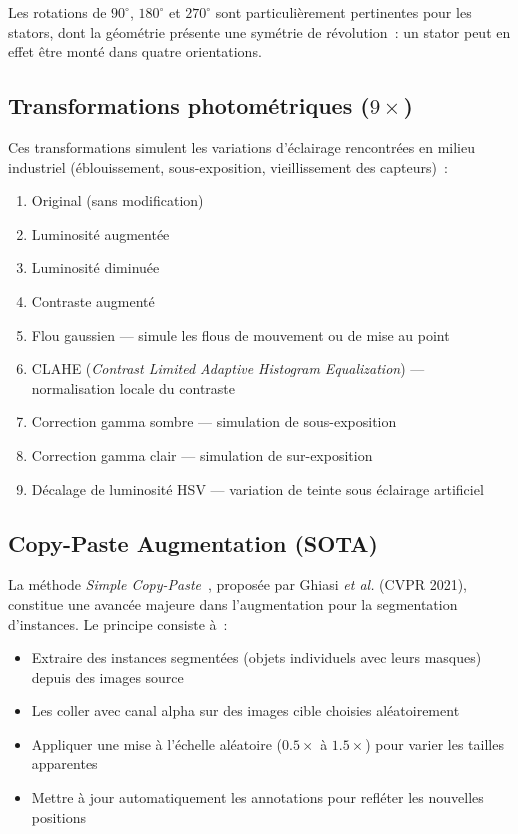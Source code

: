 \documentclass[12pt,a4paper]{report}
\begin{document}
Les rotations de $90^{\circ}$, $180^{\circ}$ et $270^{\circ}$ sont particuli\`erement pertinentes pour les stators, dont la g\'eom\'etrie pr\'esente une sym\'etrie de r\'evolution~: un stator peut en effet \^etre mont\'e dans quatre orientations.

\subsection{Transformations photom\'etriques ($9\times$)}

Ces transformations simulent les variations d'\'eclairage rencontr\'ees en milieu industriel (\'eblouissement, sous-exposition, vieillissement des capteurs)~:
\begin{enumerate}
    \item Original (sans modification)
    \item Luminosit\'e augment\'ee
    \item Luminosit\'e diminu\'ee
    \item Contraste augment\'e
    \item Flou gaussien --- simule les flous de mouvement ou de mise au point
    \item CLAHE (\textit{Contrast Limited Adaptive Histogram Equalization}) --- normalisation locale du contraste
    \item Correction gamma sombre --- simulation de sous-exposition
    \item Correction gamma clair --- simulation de sur-exposition
    \item D\'ecalage de luminosit\'e HSV --- variation de teinte sous \'eclairage artificiel
\end{enumerate}

\subsection{Copy-Paste Augmentation (SOTA)}

La m\'ethode \textit{Simple Copy-Paste}~\cite{ghiasi2021copypaste}, propos\'ee par Ghiasi \textit{et al.} (CVPR 2021), constitue une avanc\'ee majeure dans l'augmentation pour la segmentation d'instances. Le principe consiste \`a~:
\begin{itemize}
    \item Extraire des instances segment\'ees (objets individuels avec leurs masques) depuis des images source
    \item Les coller avec canal alpha sur des images cible choisies al\'eatoirement
    \item Appliquer une mise \`a l'\'echelle al\'eatoire ($0.5\times$ \`a $1.5\times$) pour varier les tailles apparentes
    \item Mettre \`a jour automatiquement les annotations pour refl\'eter les nouvelles positions
\end{itemize}
\end{document}
